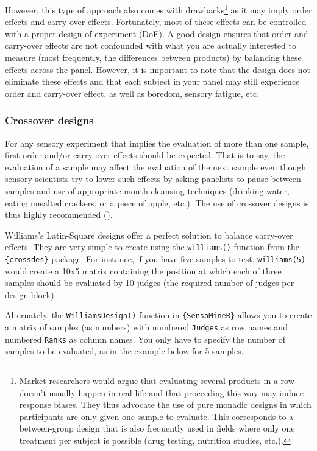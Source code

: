 \documentclass[
]{book}
\begin{document}
However, this type of approach also comes with drawbacks\footnote{Market researchers would argue that evaluating several products in a row doesn't usually happen in real life and that proceeding this way may induce response biases. They thus advocate the use of pure monadic designs in which participants are only given one sample to evaluate. This corresponds to a between-group design that is also frequently used in fields where only one treatment per subject is possible (drug testing, nutrition studies, etc.).} as it may imply order effects and carry-over effects. Fortunately, most of these effects can be controlled with a proper design of experiment (DoE). A good design ensures that order and carry-over effects are not confounded with what you are actually interested to measure (most frequently, the differences between products) by balancing these effects across the panel. However, it is important to note that the design does not eliminate these effects and that each subject in your panel may still experience order and carry-over effect, as well as boredom, sensory fatigue, etc.

\hypertarget{crossover-designs}{%
\subsubsection{Crossover designs}\label{crossover-designs}}

For any sensory experiment that implies the evaluation of more than one sample, first-order and/or carry-over effects should be expected. That is to say, the evaluation of a sample may affect the evaluation of the next sample even though sensory scientists try to lower such effects by asking panelists to pause between samples and use of appropriate mouth-cleansing techniques (drinking water, eating unsalted crackers, or a piece of apple, etc.). The use of crossover designs is thus highly recommended (\citet{Macfie1989}).

Williams's Latin-Square designs offer a perfect solution to balance carry-over effects. They are very simple to create using the \texttt{williams()} function from the \texttt{\{crossdes\}} package. For instance, if you have five samples to test, \texttt{williams(5)} would create a 10x5 matrix containing the position at which each of three samples should be evaluated by 10 judges (the required number of judges per design block).

Alternately, the \texttt{WilliamsDesign()} function in \texttt{\{SensoMineR\}} allows you to create a matrix of samples (as numbers) with numbered \texttt{Judges} as row names and numbered \texttt{Ranks} as column names. You only have to specify the number of samples to be evaluated, as in the example below for 5 samples.
\end{document}
